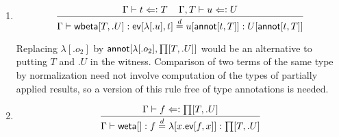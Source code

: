 \documentclass[11pt]{article}
\newcommand{\eqd}{\stackrel{d}{=}}
\newcommand{\spc}{{\,\,\,\,\,\,\,}}
\newcommand{\force}{\Leftarrow\vcentcolon}
\newcommand{\ha}[2]{#1[#2]}
\newcommand{\weta}{{\sf weta}}
\newcommand{\annot}{{\sf annot}}
\newcommand{\ev}{{\sf ev}}
\newcommand{\wbeta}{{\sf wbeta}}
\begin{document}
\begin{enumerate}
For simplicity, assume that $f'$ is $f$, and observe that $\Gamma \vdash
\ha\ev{f',t'} \force U[\ha\annot{t,T}]$ may not be valid, even though $\Gamma
\vdash \ha\ev{f',t'} \force U[\ha\annot{t',T}]$ is.  Nevertheless, $\Gamma \vdash
\ha\ev{f',t'} : U[\ha\annot{t,T}]$ is valid in the underlying type theory where
the witnesses have been forgotten.

\item 
$$\frac{ \Gamma\vdash t \force T\spc \Gamma, T\vdash u \force U}{\Gamma\vdash \ha\wbeta{T,.U} : \ha\ev{\ha\lambda{.u},t} \eqd u[\ha\annot{t,T}] : U[\ha\annot{t,T}]}$$

Replacing $\ha\lambda{.o_2}$ by
$\ha\annot{\ha\lambda{.o_2},\ha\prod{T,.U}}$ would be an alternative to
putting $T$ and $.U$ in the witness.  Comparison of two terms of the same
type by normalization need not involve computation of the types of partially
applied results, so a version of this rule free of type annotations is needed.

\item 
$$\frac{\Gamma\vdash f \force \ha\prod{T,.U}}{\Gamma\vdash \ha\weta{} : f \eqd \ha\lambda{x.\ha\ev{f,x}} : \ha\prod{T,.U}}$$ 

\end{enumerate}



\end{document}
